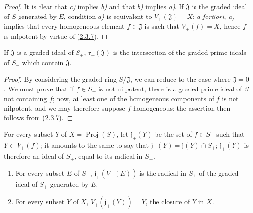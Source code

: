 \begin{proof}
It is clear that \emph{c)} implies \emph{b)} and that \emph{b)} implies \emph{a)}. If $\mathfrak{J}$ is
the graded ideal of $S$ generated by $E$, condition \emph{a)} is equivalent to
$V_+(\mathfrak{J})=X$; \emph{a fortiori}, \emph{a)} implies that every homogeneous
element $f\in\mathfrak{J}$ is such that $V_+(f)=X$, hence $f$ is nilpotent
by virtue of (\hyperref[II.2.3.7]{2.3.7}).
\end{proof}

\begin{corollary}[2.3.9]
\label{II.2.3.9}
If $\mathfrak{J}$ is a graded ideal of $S_+$,
$\mathfrak{r}_+(\mathfrak{J})$ is the intersection of the graded prime ideals of
$S_+$ which contain $\mathfrak{J}$.
\end{corollary}

\begin{proof}
By considering the graded ring $S/\mathfrak{J}$, we can reduce to the case
where $\mathfrak{J}=0$. We must prove that if $f\in S_+$ is not
nilpotent, there is a graded prime ideal of $S$ not containing $f$; now,
at least one of the homogeneous components of $f$ is not nilpotent, and we
may therefore suppose $f$ homogeneous; the assertion then follows from
(\hyperref[II.2.3.7]{2.3.7}).
\end{proof}

\begin{env}[2.3.10]
\label{II.2.3.10}
For every subset $Y$ of $X=\operatorname{Proj}(S)$, let
$\mathfrak{j}_+(Y)$ be the set of $f\in S_+$ such that
$Y\subset V_+(f)$; it amounts to the same to say that
$\mathfrak{j}_+(Y)=\mathfrak{j}(Y)\cap S_+$; $\mathfrak{j}_+(Y)$ is
therefore an ideal of $S_+$, equal to its radical in $S_+$.
\end{env}

\begin{proposition}[2.3.11]
\label{II.2.3.11}
\begin{enumerate}
  \item[\rm(i)] For every subset $E$ of $S_+$,
    $\mathfrak{j}_+(V_+(E))$ is the radical in $S_+$ of the graded ideal of
    $S_+$ generated by $E$.
  \item[\rm(ii)] For every subset $Y$ of $X$,
    $V_+(\mathfrak{j}_+(Y))=\overline{Y}$, the closure of $Y$ in $X$.
\end{enumerate}
\end{proposition}

